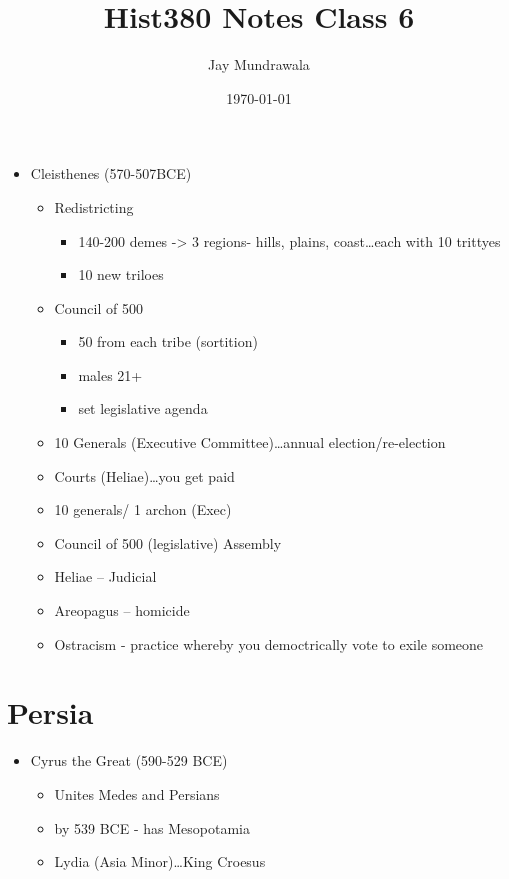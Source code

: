 \documentclass[11pt, a4paper]{article}
\begin{document}
\title{Hist380 Notes Class 6}
\author{Jay Mundrawala}
\date{\today}
\maketitle

\begin{itemize}
  \item Cleisthenes (570-507BCE)
    \begin{itemize}
      \item Redistricting
        \begin{itemize}
          \item 140-200 demes -> 3 regions- hills, plains, coast\dots each with 10 trittyes
          \item 10 new triloes
        \end{itemize}
      \item Council of 500
        \begin{itemize}
          \item 50 from each tribe (sortition)
          \item males 21+
          \item set legislative agenda
        \end{itemize}
      \item 10 Generals (Executive Committee)\dots annual election/re-election
      \item Courts (Heliae)\dots you get paid
      \item 10 generals/ 1 archon (Exec)
      \item Council of 500 (legislative) Assembly
      \item Heliae -- Judicial
      \item Areopagus -- homicide
      \item Ostracism - practice whereby you democtrically vote to exile someone
    \end{itemize}
\end{itemize}
\section{Persia}
\begin{itemize}
  \item Cyrus the Great (590-529 BCE)
    \begin{itemize}
      \item Unites Medes and Persians
      \item by 539 BCE - has Mesopotamia
      \item Lydia (Asia Minor)\dots King Croesus
    \end{itemize}
\end{itemize}
\end{document}
